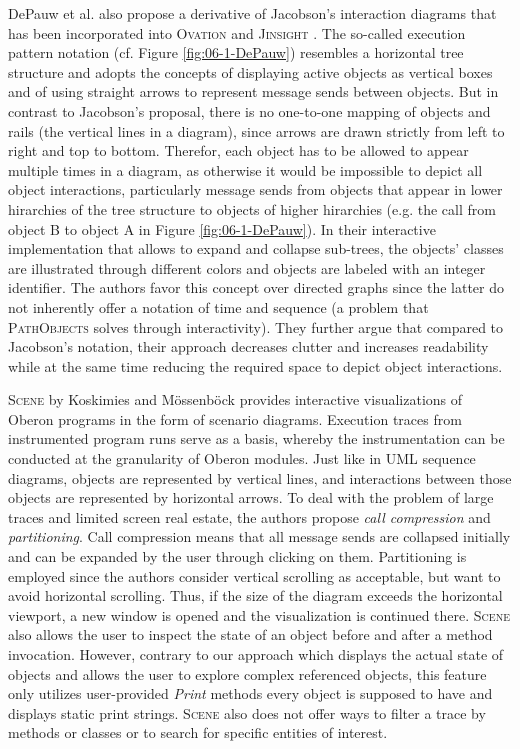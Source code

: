 DePauw et al. also propose a derivative of Jacobson's interaction diagrams \cite{de_pauw_execution_1998, jacobson_object-oriented_2004} that has been incorporated into \textsc{Ovation} \cite{de_pauw_visualizing_1993, tokoro_modeling_1994} and \textsc{Jinsight} \cite{de_pauw_visualizing_1998}.
The so-called execution pattern notation (cf. Figure \ref{fig:06-1-DePauw}) resembles a horizontal tree structure and adopts the concepts of displaying active objects as vertical boxes and of using straight arrows to represent message sends between objects.
But in contrast to Jacobson's proposal, there is no one-to-one mapping of objects and rails (the vertical lines in a diagram), since arrows are drawn strictly from left to right and top to bottom.
Therefor, each object has to be allowed to appear multiple times in a diagram, as otherwise it would be impossible to depict all object interactions, particularly message sends from objects that appear in lower hirarchies of the tree structure to objects of higher hirarchies (e.g. the call from object B to object A in Figure \ref{fig:06-1-DePauw}).
In their interactive implementation that allows to expand and collapse sub-trees, the objects' classes are illustrated through different colors and objects are labeled with an integer identifier.
The authors favor this concept over directed graphs since the latter do not inherently offer a notation of time and sequence (a problem that \textsc{PathObjects} solves through interactivity).
They further argue that compared to Jacobson's notation, their approach decreases clutter and increases readability while at the same time reducing the required space to depict object interactions.

\textsc{Scene} by Koskimies and Mössenböck \cite{koskimies_scene:_1996} provides interactive visualizations of Oberon programs in the form of scenario diagrams.
Execution traces from instrumented program runs serve as a basis, whereby the instrumentation can be conducted at the granularity of Oberon modules.
Just like in UML sequence diagrams, objects are represented by vertical lines, and interactions between those objects are represented by horizontal arrows.
To deal with the problem of large traces and limited screen  real estate, the authors propose \emph{call compression} and \emph{partitioning}.
Call compression means that all message sends are collapsed initially and can be expanded by the user through clicking on them.
Partitioning is employed since the authors consider vertical scrolling as acceptable, but want to avoid horizontal scrolling. Thus, if the size of the diagram exceeds the horizontal viewport, a new window is opened and the visualization is continued there.
\textsc{Scene} also allows the user to inspect the state of an object before and after a method invocation.
However, contrary to our approach which displays the actual state of objects and allows the user to explore complex referenced objects, this feature only utilizes user-provided \emph{Print} methods every object is supposed to have and displays static print strings.
\textsc{Scene} also does not offer ways to filter a trace by methods or classes or to search for specific entities of interest.


